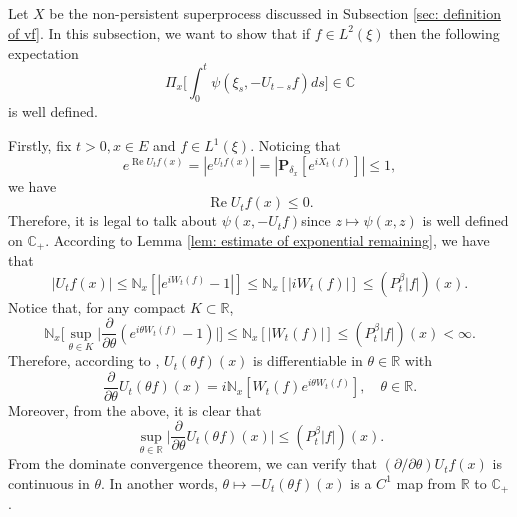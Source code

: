 \documentclass[12pt,oneside,english]{amsart}
\theoremstyle{plain}
\theoremstyle{definition}
\numberwithin{equation}{section}
\begin{document}
\subsection{}
    Let $X$ be the non-persistent superprocess discussed in Subsection \ref{sec: definition of vf}.
    In this subsection, we want to show that if $f\in L^2(\xi)$ then the following expectation
\[
    \Pi_x\Big[\int_0^t \psi(\xi_s,- U_{t-s}f)ds\Big]
    \in \mathbb C
\]
    is well defined.

    Firstly, fix $t > 0,x\in E$ and $f\in L^1(\xi)$.
    Noticing that
\[
     e^{\operatorname{Re} U_tf(x)}
    = |e^{U_tf(x)}|
    = |\mathbf P_{\delta_x}[e^{i X_t(f)}]|
    \leq 1,
\]
    we have
\begin{equation}
\label{eq: -v has positive real part}
 \operatorname{Re} U_tf(x)
    \leq 0.
\end{equation}
    Therefore, it is legal to talk about $\psi(x,-U_tf)$since $z\mapsto \psi(x,z)$ is well defined on $\mathbb C_+$.
    According to Lemma \ref{lem: estimate of exponential remaining}, we have that
\begin{equation}
\label{eq: upper bound for vf}
    |U_tf(x)| \leq \mathbb N_x[|e^{i W_t(f)} - 1|]
    \leq \mathbb N_x[|i W_t(f)|]
    \leq (P^\beta_t |f|)(x).
\end{equation}
    Notice that, for any compact $K \subset \mathbb R$,
\begin{equation}
\label{eq: estimate of deriavetive of v(theta)}
    \mathbb N_x\Big[\sup_{\theta \in K} \Big|\frac{\partial}{\partial \theta} (e^{i\theta W_t(f)} - 1) \Big|\Big]
    \leq \mathbb N_x[|W_t(f)|] \leq (P^\beta_t |f|)(x) < \infty.
\end{equation}
    Therefore, according to \cite[Theorem A.5.2.]{Durrett2010Probability},
    $U_t(\theta f)(x)$ is differentiable in $\theta \in \mathbb R$ with
\[
    \frac{\partial}{\partial \theta} U_t(\theta f)(x)
    = i\mathbb N_x[W_t(f)e^{i\theta W_t(f)}],
    \quad \theta \in \mathbb R.
\]
    Moreover, from the above, it is clear that
\begin{equation}
\label{eq: upper bounded for derivative of v(theta)}
    \sup_{\theta \in \mathbb R}\Big| \frac{\partial}{\partial \theta}U_t(\theta f)(x)\Big|
    \leq ( P^\beta_t |f|)(x).
\end{equation}
    From the dominate convergence theorem, we can verify that $(\partial/\partial \theta)U_tf(x)$ is continuous in $\theta$.
    In another words, $\theta \mapsto -U_t(\theta f)(x)$ is a $C^1$ map from $\mathbb R$ to $\mathbb C_+$.
\end{document}
